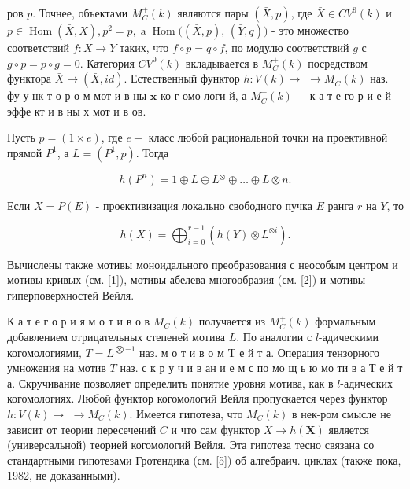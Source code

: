 \documentclass[10pt]{article}
\begin{document}
ров $p$. Точнее, объектами $M_{C}^{+}(k)$ являются пары $(\bar{X}, p)$, где $\bar{X} \in C V^{0}(k)$ и $p \in \operatorname{Hom}(\bar{X}, X), p^{2}=p, \operatorname{a} \operatorname{Hom}((\bar{X}, p)$, $(\bar{Y}, q))$ - это множество соответствий $f: \bar{X} \rightarrow \bar{Y}$ таких, что $f \circ p=q \circ f$, по модулю соответствий $g$ с $g \circ p=p \circ g=0$. Категория $C V^{0}(k)$ вкладывается в $M_{C}^{+}(k)$ посредством функтора $\bar{X} \rightarrow(\bar{X}, i d)$. Естественный функтор $h: V(k) \rightarrow$ $\rightarrow M_{C}^{+}(k)$ наз. фу у нк т о р о м мот и в ны $\mathbf{x}$ ко г омо логи й, а $M_{C}^{+}(k)-$ к а т е го р и е й эффе кт и в ны х мот и в ов.



Пусть $p=(1 \times e)$, где $e-$ класс любой рациональной точки на проективной прямой $P^{1}$, а $L=\left(P^{1}, p\right)$. Тогда



\[

h\left(P^{n}\right)=1 \oplus L \oplus L{ }^{\otimes} \oplus \ldots \oplus L \otimes n .

\]



Если $X=P(E)$ - проективизация локально свободного пучка $E$ ранга $r$ на $Y$, то



\[

h(X)=\bigoplus_{i=0}^{r-1}\left(h(Y) \otimes L^{\otimes i}\right) .

\]



Вычислены также мотивы моноидального преобразования с неособым центром и мотивы кривых (см. [1]), мотивы абелева многообразия (см. [2]) и мотивы гиперповерхностей Вейля.



К а т е г о р и я м о т и в о в $M_{C}(k)$ получается из $M_{C}^{+}(k)$ формальным добавлением отрицательных степеней мотива $L$. По аналогии с $l$-адическими когомологиями, $T=L^{\bigotimes-1}$ наз. м о т и в о м $\mathrm{T}$ е й т а. Операция тензорного умножения на мотив $T$ наз. с к р у ч и в ан и е м с по мо щ ь ю мо ти в а Т е й т а. Скручивание позволяет определить понятие уровня мотива, как в $l$-адических когомологиях. Любой функтор когомологий Вейля пропускается через функтор $h: V(k) \rightarrow$ $\rightarrow M_{C}(k)$. Имеется гипотеза, что $M_{C}(k)$ в нек-ром смысле не зависит от теории пересечений $C$ и что сам функтор $X \rightarrow h(\boldsymbol{X})$ является (универсальной) теорией когомологий Вейля. Эта гипотеза тесно связана со стандартными гипотезами Гротендика (см. [5]) об алгебраич. циклах (также пока, 1982, не доказанными).
\end{document}
